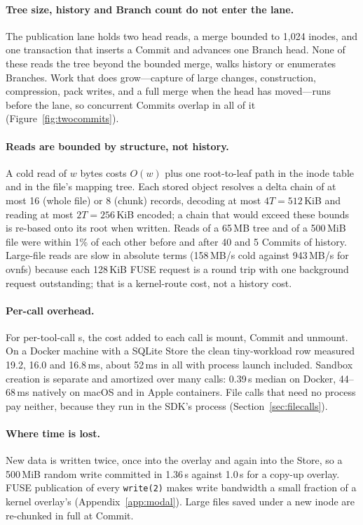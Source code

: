\paragraph{Tree size, history and Branch count do not enter the lane.} The publication
lane holds two head reads, a merge bounded to 1,024 inodes, and one transaction that
inserts a Commit and advances one Branch head. None of these reads the tree beyond the
bounded merge, walks history or enumerates Branches. Work that does grow---capture of
large changes, construction, compression, pack writes, and a full merge when the head
has moved---runs before the lane, so concurrent Commits overlap in all of it
(Figure~\ref{fig:twocommits}).

\paragraph{Reads are bounded by structure, not history.} A cold read of $w$ bytes costs
$O(w)$ plus one root-to-leaf path in the inode table and in the file's mapping tree. Each
stored object resolves a delta chain of at most 16 (whole file) or 8 (chunk) records,
decoding at most $4T = 512$\,KiB and reading at most $2T = 256$\,KiB encoded; a chain
that would exceed these bounds is re-based onto its root when written. Reads of a 65\,MB
tree and of a 500\,MiB file were within 1\% of each other before and after 40 and 5
Commits of history. Large-file reads are slow in absolute terms (158\,MB/s cold against
943\,MB/s for ovnfs) because each 128\,KiB FUSE request is a round trip with one
background request outstanding; that is a kernel-route cost, not a history cost.

\paragraph{Per-call overhead.} For per-tool-call \ws{}s, the cost added to each call is
mount, Commit and unmount. On a Docker machine with a SQLite Store the clean tiny-workload
row measured 19.2, 16.0 and 16.8\,ms, about 52\,ms in all with process launch included.
Sandbox creation is separate and amortized over many calls: 0.39\,s median on Docker,
44--68\,ms natively on macOS and in Apple containers. File calls that need no process
pay neither, because they run in the SDK's process (Section~\ref{sec:filecalls}).

\paragraph{Where time is lost.} New data is written twice, once into the overlay and
again into the Store, so a 500\,MiB random write committed in 1.36\,s against 1.0\,s for
a copy-up overlay. FUSE publication of every \texttt{write(2)} makes write bandwidth a
small fraction of a kernel overlay's (Appendix~\ref{app:modal}). Large files saved under
a new inode are re-chunked in full at Commit.

